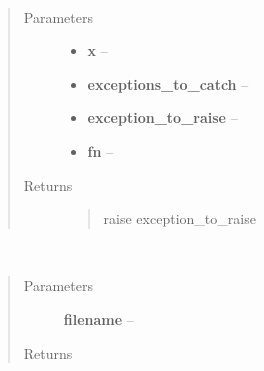 \documentclass[letterpaper,10pt,english]{sphinxmanual}
\begin{document}
\begin{fulllineitems}
\label{index:aietes.Tools.try_x_times}~\begin{quote}\begin{description}
\item[{Parameters}] \leavevmode\begin{itemize}
\item {} 
\textbf{x} -- 

\item {} 
\textbf{exceptions\_to\_catch} -- 

\item {} 
\textbf{exception\_to\_raise} -- 

\item {} 
\textbf{fn} -- 

\end{itemize}

\item[{Returns}] \leavevmode
\begin{quote}\begin{description}
\item[{raise exception\_to\_raise}] \leavevmode
\end{description}\end{quote}


\end{description}\end{quote}

\end{fulllineitems}


\begin{fulllineitems}
\label{index:aietes.Tools.uncpickle}~\begin{quote}\begin{description}
\item[{Parameters}] \leavevmode
\textbf{filename} -- 

\item[{Returns}] \leavevmode


\end{description}\end{quote}

\end{fulllineitems}
\end{document}
